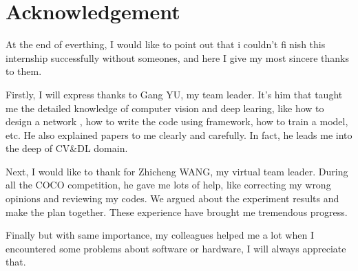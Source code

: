 \chapter{Acknowledgement}

At the end of everthing, I would like to point out that i couldn't finish this internship
successfully without someones, and here I give my most sincere thanks to them.

Firstly, I will express thanks to Gang YU, my team leader. It's him
that taught me the detailed knowledge of computer vision and deep learing, like how to design a network , how to write the code using framework, how to train a model, etc.
He also explained papers to me clearly and carefully.
In fact, he leads me into the deep of CV\&DL domain.

Next, I would like to thank for Zhicheng WANG, my virtual team leader.
During all the COCO competition, he gave me lots of help, like correcting my wrong opinions and reviewing my codes.
We argued about the experiment results and make the plan together.
These experience have brought me tremendous progress.

Finally but with same importance, my colleagues helped me a lot when I encountered
some problems about software or hardware, I will always appreciate that.

